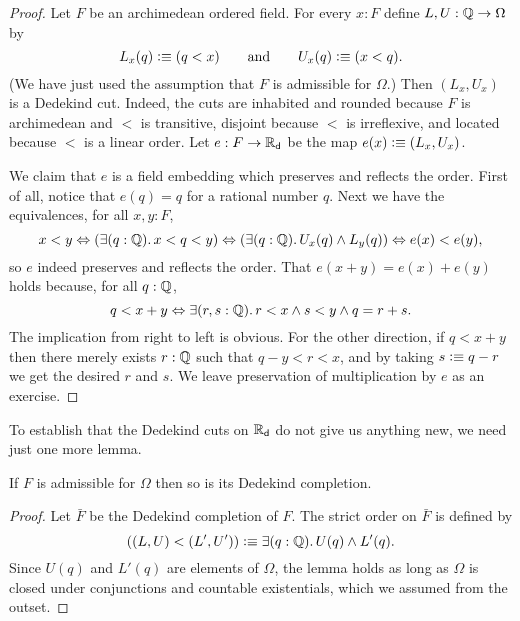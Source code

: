 \begin{proof}
  Let $F$ be an archimedean ordered field. For every $x : F$ define $L, U : \mathbb{Q} \to
  \Omega$ by
  \begin{equation*}
    L_x(q) \vcentcolon\equiv (q < x)
    \qquad\text{and}\qquad
    U_x(q) \vcentcolon\equiv (x < q).
  \end{equation*}
  (We have just used the assumption that $F$ is admissible for $\Omega$.)
  Then $(L_x, U_x)$ is a Dedekind cut. Indeed, the cuts are inhabited and rounded because
  $F$ is archimedean and $<$ is transitive, disjoint because $<$ is irreflexive, and
  located because $<$ is a linear order. Let $e : F \to \mathbb{R}_\mathsf{d}$ be the map $e(x) \vcentcolon\equiv (L_x,
  U_x)$.

  We claim that $e$ is a field embedding which preserves and reflects the order. First of
  all, notice that $e(q) = q$ for a rational number $q$. Next we have the equivalences,
  for all $x, y : F$,
  \begin{equation*}
    x < y \Leftrightarrow
    (\exis{q : \Q} x < q < y) \Leftrightarrow
    (\exis{q : \Q} U_x(q) \land L_y(q)) \Leftrightarrow
    e(x) < e(y),
  \end{equation*}
  so $e$ indeed preserves and reflects the order. That $e(x + y) = e(x) + e(y)$ holds
  because, for all $q : \mathbb{Q}$,
  \begin{equation*}
    q < x + y \Leftrightarrow
    \exis{r, s : \Q} r < x \land s < y \land q = r + s.
  \end{equation*}
  The implication from right to left is obvious. For the other direction, if $q < x +
  y$ then there merely exists $r : \mathbb{Q}$ such that $q - y < r < x$, and by taking $s \vcentcolon\equiv
  q - r$ we get the desired $r$ and $s$. We leave preservation of multiplication by $e$ as
  an exercise.
\end{proof}

To establish that the Dedekind cuts on $\mathbb{R}_\mathsf{d}$ do not give us anything new, we need just one
more lemma.

\begin{lem} \label{lem:cuts-preserve-admissibility}
  If $F$ is admissible for $\Omega$ then so is its Dedekind completion.
\end{lem}

\begin{proof}
  Let $\bar{F}$ be the Dedekind completion of $F$. The strict order on $\bar{F}$ is
  defined by
  \begin{equation*}
    ((L,U) < (L',U')) \defeq \exis{q : \Q} U(q) \land L'(q).
  \end{equation*}
  Since $U(q)$ and $L'(q)$ are elements of $\Omega$, the lemma holds as long as $\Omega$
  is closed under conjunctions and countable existentials, which we assumed from the outset.
\end{proof}


